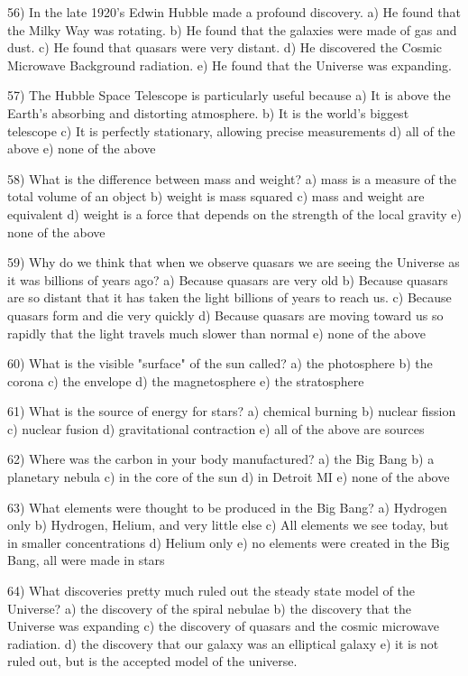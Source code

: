 56) In the late 1920's Edwin Hubble made a profound discovery.
a) He found that the Milky Way was rotating.
b) He found that the galaxies were made of gas and dust.
c) He found that quasars were very distant.
d) He discovered the Cosmic Microwave Background radiation.
e) He found that the Universe was expanding.

57) The Hubble Space Telescope is particularly useful because
a) It is above the Earth's absorbing and distorting atmosphere.
b) It is the world's biggest telescope
c) It is perfectly stationary, allowing precise measurements
d) all of the above
e) none of the above

58) What is the difference between mass and weight?
a) mass is a measure of the total volume of an object
b) weight is mass squared
c) mass and weight are equivalent
d) weight is a force that depends on the strength of the local gravity
e) none of the above

59) Why do we think that when we observe quasars we are seeing the Universe
as it was billions of years ago?
a) Because quasars are very old
b) Because quasars are so distant that it has taken the light billions
of years to reach us.
c) Because quasars form and die very quickly
d) Because quasars are moving toward us so rapidly that the light travels
much slower than normal
e) none of the above

60) What is the visible "surface" of the sun called?
a) the photosphere b) the corona c) the envelope d) the magnetosphere
e) the stratosphere

61) What is the source of energy for stars?
a) chemical burning b) nuclear fission c) nuclear fusion
d) gravitational contraction e) all of the above are sources

62) Where was the carbon in your body manufactured?
a) the Big Bang b) a planetary nebula c) in the core of the sun
d) in Detroit MI e) none of the above

63) What elements were thought to be produced in the Big Bang?
a) Hydrogen only
b) Hydrogen, Helium, and very little else
c) All elements we see today, but in smaller concentrations
d) Helium only
e) no elements were created in the Big Bang, all were made in stars

64) What discoveries pretty much ruled out the steady state model of the
Universe?
a) the discovery of the spiral nebulae
b) the discovery that the Universe was expanding
c) the discovery of quasars and the cosmic microwave radiation.
d) the discovery that our galaxy was an elliptical galaxy
e) it is not ruled out, but is the accepted model of the universe.

